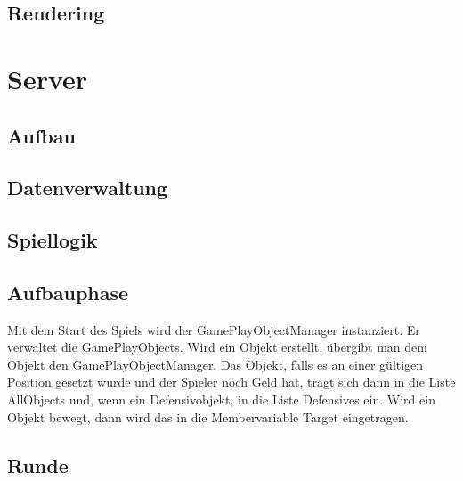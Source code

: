 \documentclass[ngerman, 12pt, pdftex]{scrartcl}[2006/07/30]
\begin{document}
\subsection{Rendering}


\section{Server}


\subsection{Aufbau}
\subsection{Datenverwaltung}


\subsection{Spiellogik}
\subsection{Aufbauphase}
Mit dem Start des Spiels wird der GamePlayObjectManager instanziert. Er verwaltet die GamePlayObjects.
Wird ein Objekt erstellt, \"{u}bergibt man dem Objekt den GamePlayObjectManager. Das Objekt, falls es an einer g\"{u}ltigen Position gesetzt wurde und der Spieler noch Geld hat, tr\"{a}gt sich dann in die Liste AllObjects und, wenn ein Defensivobjekt, in die Liste Defensives ein. Wird ein Objekt bewegt, dann wird das in die Membervariable Target eingetragen.

\subsection{Runde}
\end{document}

